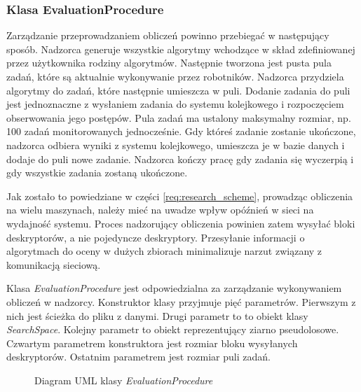 \documentclass[../thesis.tex]{subfiles}
\begin{document}
\subsubsection{Klasa EvaluationProcedure}

Zarządzanie przeprowadzaniem obliczeń powinno przebiegać w następujący sposób. Nadzorca generuje wszystkie algorytmy wchodzące w skład zdefiniowanej przez użytkownika rodziny algorytmów. Następnie tworzona jest pusta pula zadań, które są aktualnie wykonywanie przez robotników. Nadzorca przydziela algorytmy do zadań, które następnie umieszcza w puli. Dodanie zadania do puli jest jednoznaczne z wysłaniem zadania do systemu kolejkowego i rozpoczęciem obserwowania jego postępów. Pula zadań ma ustalony maksymalny rozmiar, np. 100 zadań monitorowanych jednocześnie. Gdy któreś zadanie zostanie ukończone, nadzorca odbiera wyniki z systemu kolejkowego, umieszcza je w bazie danych i dodaje do puli nowe zadanie. Nadzorca kończy pracę gdy zadania się wyczerpią i gdy wszystkie zadania zostaną ukończone.

Jak zostało to powiedziane w części \ref{req:research_scheme}, prowadząc obliczenia na wielu maszynach, należy mieć na uwadze wpływ opóźnień w sieci na wydajność systemu. Proces nadzorujący obliczenia powinien zatem wysyłać bloki deskryptorów, a nie pojedyncze deskryptory. Przesyłanie informacji o algorytmach do oceny w dużych zbiorach minimalizuje narzut związany z komunikacją sieciową. 

Klasa \emph{EvaluationProcedure} jest odpowiedzialna za zarządzanie wykonywaniem obliczeń w nadzorcy. Konstruktor klasy przyjmuje pięć parametrów. Pierwszym z nich jest ścieżka do pliku z danymi. Drugi parametr to to obiekt klasy \emph{SearchSpace}. Kolejny parametr to obiekt reprezentujący ziarno pseudolosowe. Czwartym parametrem konstruktora jest rozmiar bloku wysyłanych deskryptorów. Ostatnim parametrem jest rozmiar puli zadań.

\begin{figure}[h]
\centering
{}
\caption{Diagram UML klasy \emph{EvaluationProcedure}}
\label{proj:diagram_evaluation_procedure}
\end{figure}
\end{document}
